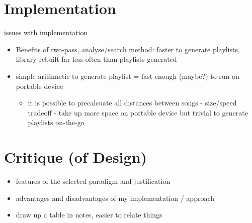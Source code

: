 \section{Implementation}
issues with implementation
\begin{itemize}
	\item Benefits of two-pass, analyse/search method: faster to generate playlists, library rebuilt far less often than playlists generated
	\item simple arithmetic to generate playlist = fast enough (maybe?) to run on portable device
	\begin{itemize}
		\item it is possible to precalcuate all distances between songs - size/speed tradeoff - take up more space on portable device but trivial to generate playlists on-the-go
	\end{itemize}
\end{itemize}
\section{Critique (of Design)}
\begin{itemize}
	\item features of the selected paradigm and justification
	\item advantages and disadvantages of my implementation / approach
	\item draw up a table in notes, easier to relate things
\end{itemize}
